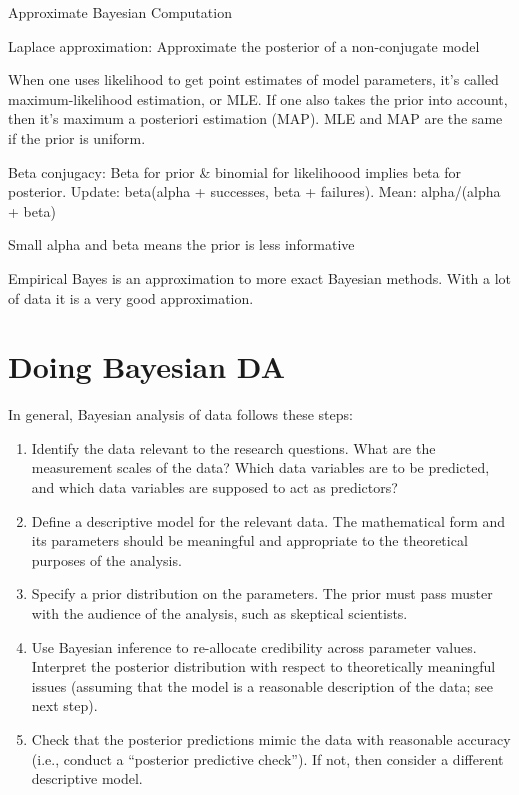\documentclass[]{book}
\begin{document}
Approximate Bayesian Computation

Laplace approximation: Approximate the posterior of a non-conjugate model

When one uses likelihood to get point estimates of model parameters, it's called maximum-likelihood estimation, or MLE. If one also takes the prior into account, then it's maximum a posteriori estimation (MAP). MLE and MAP are the same if the prior is uniform.

Beta conjugacy: Beta for prior \& binomial for likelihoood implies beta for posterior. Update: beta(alpha + successes, beta + failures). Mean: alpha/(alpha + beta)

Small alpha and beta means the prior is less informative

Empirical Bayes is an approximation to more exact Bayesian methods. With a lot of data it is a very good approximation.

\hypertarget{doing-bayesian-da}{%
\section{Doing Bayesian DA}\label{doing-bayesian-da}}

In general, Bayesian analysis of data follows these steps:

\begin{enumerate}
\def\labelenumi{\arabic{enumi}.}
\item
  Identify the data relevant to the research questions. What are the measurement scales of the data? Which data variables are to be predicted, and which data variables are supposed to act as predictors?
\item
  Define a descriptive model for the relevant data. The mathematical form and its parameters should be meaningful and appropriate to the theoretical purposes of the analysis.
\item
  Specify a prior distribution on the parameters. The prior must pass muster with the audience of the analysis, such as skeptical scientists.
\item
  Use Bayesian inference to re-allocate credibility across parameter values. Interpret the posterior distribution with respect to theoretically meaningful issues (assuming that the model is a reasonable description of the data; see next step).
\item
  Check that the posterior predictions mimic the data with reasonable accuracy (i.e., conduct a ``posterior predictive check''). If not, then consider a different descriptive model.
\end{enumerate}
\end{document}
